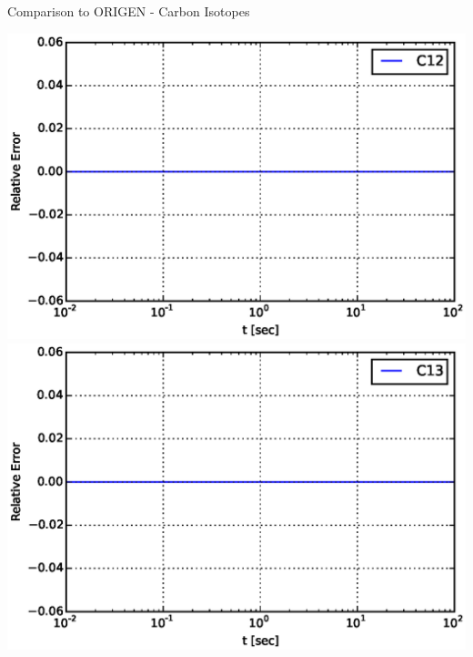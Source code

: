 \documentclass[xcolor=x11names,compress]{beamer}
\begin{document}
\begin{frame}{Comparison to ORIGEN - Carbon Isotopes}

    \vspace*{-1.5em}
    \begin{center}
    \includegraphics[scale=0.4]{decay-relative-error-C12.eps}
    \includegraphics[scale=0.4]{decay-relative-error-C13.eps}
    \end{center}


\end{frame}
\end{document}
